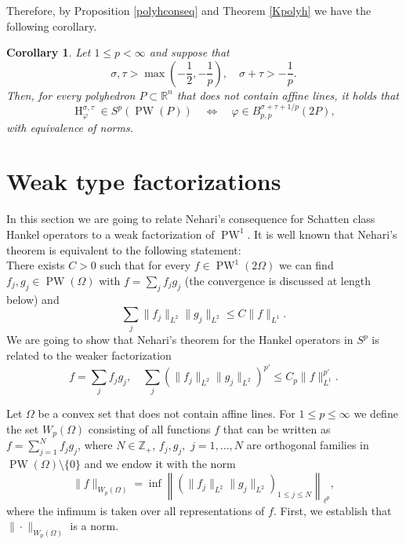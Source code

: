 \documentclass{amsart}
\theoremstyle{plain}
\newtheorem{cor}[theo]{Corollary}
\DeclareMathOperator{\Ha}{H}
\DeclareMathOperator{\PW}{PW}
\begin{document}
Therefore, by Proposition \ref{polyhconseq} and Theorem \ref{Kpolyh} we have the following corollary.

\begin{cor} Let $1\leq p<\infty$ and suppose that $$\sigma,\tau>\max(-\frac{1}{2},-\frac{1}{p}), \quad \sigma+\tau>-\frac{1}{p}.$$
	Then, for every polyhedron $P\subset \mathbb{R}^n$ that does not contain affine lines, it holds that
	$$\Ha_\varphi^{\sigma,\tau}\in S^p(\PW(P))
	\quad\Longleftrightarrow\quad
	\varphi\in B_{p,p}^{\sigma+\tau+1/p}(2P),$$
	with equivalence of norms.
\end{cor}

\section{Weak type factorizations}\label{sec5}
In this section we are going to relate Nehari's consequence for Schatten class Hankel operators to a weak factorization of $\PW^1$. It is well known that Nehari's theorem is equivalent to the following statement:
\\ There exists $C>0$ such that for every $f\in \PW^1(2\Omega)$ we can find $f_j,g_j\in \PW(\Omega)$ with $f=\sum_{j} f_jg_j$ (the convergence is discussed at length below) and $$\sum_j \|f_j\|_{L^2}\|g_j\|_{L^2}\leq C\|f\|_{L^1}.$$ We are going to show that Nehari's theorem for the Hankel operators in $S^p$ is related to the weaker factorization
$$f=\sum_{j} f_jg_j,\quad \sum_j (\|f_j\|_{L^2}\|g_j\|_{L^2})^{p'}\leq C_p\|f\|_{L^1}^{p'}.$$

Let $\Omega$ be a convex set that does not contain affine lines. For $1\leq p\leq \infty$ we define the set $W_p(\Omega)$ consisting of all functions $f$ that can be written as $f=\sum_{j=1}^N f_j g_j$, where $N\in\mathbb{Z}_+$, $f_j,g_j,$ $j=1,...,N$ are orthogonal families in $\PW(\Omega)\setminus\{0\}$ and we endow it with the norm $$\|f\|_{W_p(\Omega)}=\inf  \left\| (\|f_j\|_{L^2}\|g_j\|_{L^2})_{1\leq j\leq N}\right\|_{\ell^p},$$ where the infimum is taken over all representations of $f$. First, we establish that $\|\cdot\|_{W_p(\Omega)}$ is a norm.
\end{document}
